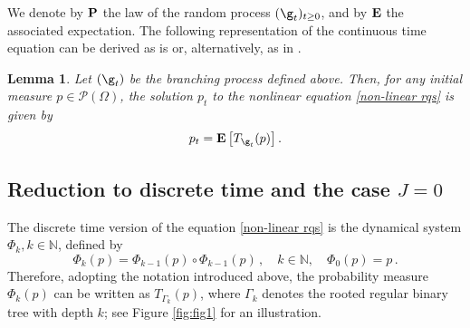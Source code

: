 \documentclass[11pt,reqno]{amsart}
\numberwithin{equation}{section}
\numberwithin{figure}{section}
\newtheorem{lemma}[theorem]{Lemma}
\newcommand{\1}{\mathds{1}}
\let\O=\Omega
\let\G=\Gamma
\newcommand{\cP}{\ensuremath{\mathcal P}}
\newcommand{\cT}{\ensuremath{\mathcal T}}
\newcommand{\bbN}{{\ensuremath{\mathbb N}} }
\begin{document}
We denote by \( {\bf P} \) the law of the random process \( (\g_t)_{t\ge 0} \), and by \( {\bf E} \) the associated expectation.
The following representation of the continuous time equation can be derived as is \cite[Lemma 3.1]{caputo2025cutoff} or, alternatively, as in \cite[Section 3.2]{CP2024nonlinear}. 
 

\begin{lemma}\label{lem:rep_ct}
Let \( (\g_t) \) be the branching process defined above. Then, for any initial measure \( p \in \cP(\O) \), the solution \( p_t \) to the nonlinear equation \eqref{non-linear rqs}
is given by %
\begin{equation} \label{eq:solt}
p_t = {\bf E}\left[ T_{\g_t}(p) \right].
\end{equation}
\end{lemma}
%

\subsection{Reduction to discrete time and the case \(J=0\)}
The discrete time version of the equation \eqref{non-linear rqs} is the dynamical system $\Phi_k, k\in\bbN$, defined by 
\[\Phi_k(p) = \Phi_{k-1}(p)\circ \Phi_{k-1}(p)\,, \quad k\in\bbN,
\quad \Phi_0(p)=p\,.\] 
 Therefore, adopting the notation introduced above, the probability measure $\Phi_{k}(p)$ can be written as $T_{\G_k}(p)$, where $\G_k$ denotes the rooted regular binary tree with depth $k$; see Figure \ref{fig:fig1}
for an illustration.
\end{document}

